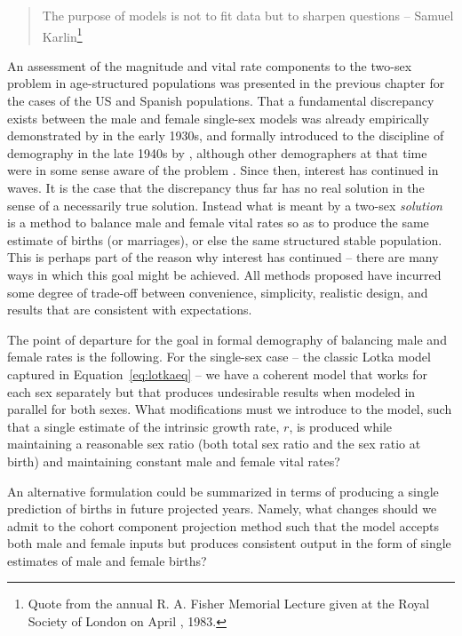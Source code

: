 \FloatBarrier
\label{sec:modelingapproaches}
\begin{singlespace}
\begin{quote}
The purpose of models is not to fit data but to sharpen questions -- Samuel
Karlin\footnote{Quote from the  annual R. A. Fisher Memorial Lecture
given at the Royal Society of London on April , 1983.}
\end{quote}
\end{singlespace}

An assessment of the magnitude and vital rate components to the two-sex
problem in age-structured populations was presented in the previous
chapter for the cases of the US and Spanish populations. That a fundamental
discrepancy exists between the male and female single-sex models was already
empirically demonstrated by \citet{kuczynski1932fertility} in the early 1930s, 
and formally introduced to the discipline of demography in the late 1940s by
\citet{karmel1947relations, karmel1948measurement}, although other demographers
at that time were in some sense aware of the problem \citep{quensel1941naagra,vincent1946mesure}. 
Since then, interest has continued in waves. It is the case that the discrepancy 
thus far has no real solution in the sense of a necessarily true solution. 
Instead what is meant by a two-sex \textit{solution} is a method to balance 
male and female vital rates so as to produce the same estimate of births (or marriages), 
or else the same structured stable population. This is
perhaps part of the reason why interest has continued -- there are many ways in
which this goal might be achieved. All methods proposed have incurred some degree of trade-off
between convenience, simplicity, realistic design, and results that are
consistent with expectations.
 
The point of departure for the goal in formal demography of balancing male and
female rates is the following. For the single-sex case -- the classic Lotka
model captured in Equation~\eqref{eq:lotkaeq} -- we have a coherent model that
works for each sex separately but that produces undesirable results when modeled
in parallel for both sexes. What modifications must we introduce to the model, such that a single
estimate of the intrinsic growth rate, $r$, is produced while maintaining a
reasonable sex ratio (both total sex ratio and the sex ratio at birth) and
maintaining constant male and female vital rates? 

An alternative formulation
could be summarized in terms of producing a single prediction of births in
future projected years. Namely, what changes should we admit to the cohort
component projection method such that the model accepts both male and
female inputs but produces consistent output in the form of single estimates of
male and female births?

